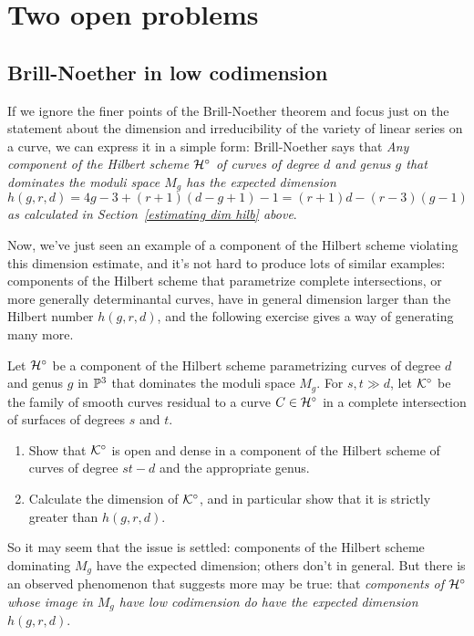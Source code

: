 \section{Two open problems}

\subsection{Brill-Noether in low codimension}

If we ignore the finer points of the Brill-Noether theorem and focus just on the statement about the dimension and irreducibility of the variety of linear series on a curve, we can express it in a simple form: Brill-Noether says that \emph{Any component of the Hilbert scheme ${\cal H}^\circ$ of curves of degree $d$ and genus $g$ that dominates the moduli space $M_g$ has the expected dimension 
$$
h(g,r,d) = 4g-3 + (r+1)(d-g+1) - 1 = (r+1)d - (r-3)(g-1)
$$
 as calculated in Section~\ref{estimating dim hilb} above}.
 
 
Now, we've just seen an example of a component of the Hilbert scheme violating this dimension estimate, and it's not hard to produce lots of similar examples: components of the Hilbert scheme that parametrize complete intersections, or more generally determinantal curves, have in general dimension larger than the Hilbert number $h(g,r,d)$, and the following exercise gives a way of generating many more.

\begin{exercise}
Let ${\cal H}^\circ$ be a component of the Hilbert scheme parametrizing curves of degree $d$ and genus $g$ in ${\mathbb P}^3$ that dominates the moduli space $M_g$. For $s, t \gg d$, let ${\cal K}^\circ$ be the family of smooth curves residual to a curve $C \in  {\cal H}^\circ$ in a complete intersection of surfaces of degrees $s$ and $t$.
\begin{enumerate}
\item Show that ${\cal K}^\circ$ is open and dense in a component of the Hilbert scheme of curves of degree $st-d$ and the appropriate genus.
\item Calculate the dimension of ${\cal K}^\circ$, and in particular show that it is strictly greater than $h(g,r,d)$.
\end{enumerate}
\end{exercise}

So it may seem that the issue is settled: components of the Hilbert scheme dominating $M_g$ have the expected dimension; others don't in general. But there is an observed phenomenon that suggests more may be true: that \emph{components of ${\cal H}^\circ$ whose image in $M_g$ have low codimension do have the expected dimension $h(g,r,d)$}. 

